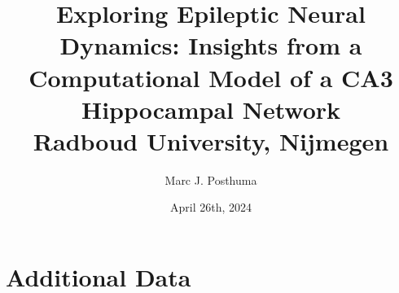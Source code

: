 \documentclass[12pt]{report}
\title{
    {Exploring Epileptic Neural Dynamics: Insights from a Computational Model of a CA3 Hippocampal Network}\\
    {\large Radboud University, Nijmegen}\\
}
\author{Marc J. Posthuma}
\date{April 26th, 2024}
\begin{document}
\maketitle

\tableofcontents
\listoffigures
\listoftables






\appendix
\chapter{Additional Data}


\printbibliography%
\end{document}
